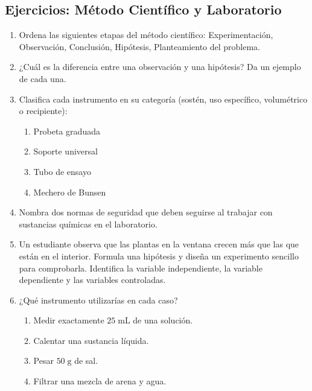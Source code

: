 \documentclass[12pt, a4paper]{article}
\begin{document}
\newpage

\subsection{Ejercicios: Método Científico y Laboratorio}

\begin{enumerate}[leftmargin=*]
  \item \facil{} Ordena las siguientes etapas del método científico: Experimentación, Observación, Conclusión, Hipótesis, Planteamiento del problema.

  \item \facil{} ¿Cuál es la diferencia entre una observación y una hipótesis? Da un ejemplo de cada una.

  \item \facil{} Clasifica cada instrumento en su categoría (sostén, uso específico, volumétrico o recipiente):
  \begin{enumerate}[label=\alph*)]
    \item Probeta graduada
    \item Soporte universal
    \item Tubo de ensayo
    \item Mechero de Bunsen
  \end{enumerate}

  \item \facil{} Nombra dos normas de seguridad que deben seguirse al trabajar con sustancias químicas en el laboratorio.

  \item \medio{} Un estudiante observa que las plantas en la ventana crecen más que las que están en el interior. Formula una hipótesis y diseña un experimento sencillo para comprobarla. Identifica la variable independiente, la variable dependiente y las variables controladas.

  \item \medio{} ¿Qué instrumento utilizarías en cada caso?
  \begin{enumerate}[label=\alph*)]
    \item Medir exactamente $25\;\text{mL}$ de una solución.
    \item Calentar una sustancia líquida.
    \item Pesar $50\;\text{g}$ de sal.
    \item Filtrar una mezcla de arena y agua.
  \end{enumerate}


\end{enumerate}
\end{document}
